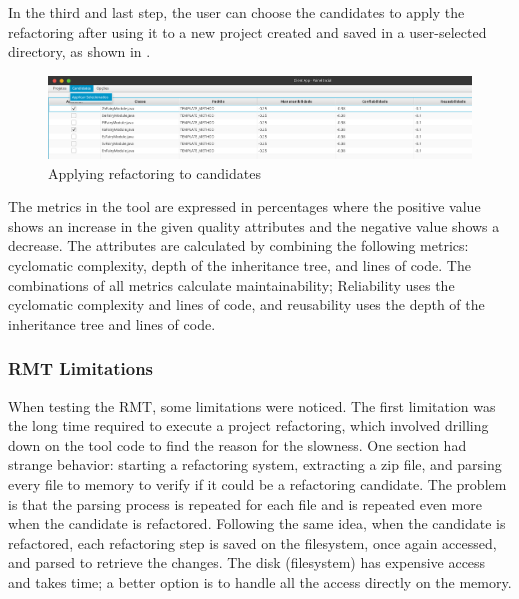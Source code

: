 In the third and last step, the user can choose the candidates to apply the refactoring after using it to a new project created and saved in a user-selected directory, as shown in .

\begin{figure}[ht!]
\SetCaptionWidth{\textwidth}
\caption{Applying refactoring to candidates}
\label{fig-refactor}
\includegraphics[width =\textwidth]{Chapter-2/Figures/refactor.png}
\end{figure}
\FloatBarrier

The metrics in the tool are expressed in percentages where the positive value shows an increase in the given quality attributes and the negative value shows a decrease. The attributes are calculated by combining the following metrics: cyclomatic complexity, depth of the inheritance tree, and lines of code. The combinations of all metrics calculate maintainability; Reliability uses the cyclomatic complexity and lines of code, and reusability uses the depth of the inheritance tree and lines of code. 

\subsubsection{RMT Limitations}
\label{subsub-limitation}
When testing the RMT, some limitations were noticed. The first limitation was the long time required to execute a project refactoring, which involved drilling down on the tool code to find the reason for the slowness. One section had strange behavior: starting a refactoring system, extracting a zip file, and parsing every file to memory to verify if it could be a refactoring candidate. The problem is that the parsing process is repeated for each file and is repeated even more when the candidate is refactored. Following the same idea, when the candidate is refactored, each refactoring step is saved on the filesystem, once again accessed, and parsed to retrieve the changes. The disk (filesystem) has expensive access and takes time; a better option is to handle all the access directly on the memory.

